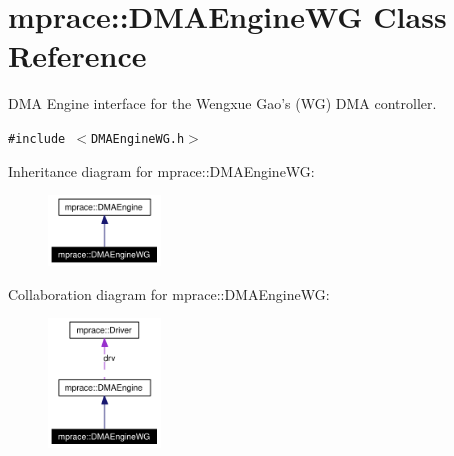 \hypertarget{classmprace_1_1DMAEngineWG}{
\section{mprace::DMAEngine\-WG Class Reference}
\label{classmprace_1_1DMAEngineWG}
}
DMA Engine interface for the Wengxue Gao's (WG) DMA controller.  


{\tt \#include $<$DMAEngine\-WG.h$>$}

Inheritance diagram for mprace::DMAEngine\-WG:\begin{figure}[H]
\begin{center}
\leavevmode
\includegraphics[width=85pt]{classmprace_1_1DMAEngineWG__inherit__graph}
\end{center}
\end{figure}
Collaboration diagram for mprace::DMAEngine\-WG:\begin{figure}[H]
\begin{center}
\leavevmode
\includegraphics[width=85pt]{classmprace_1_1DMAEngineWG__coll__graph}
\end{center}
\end{figure}
